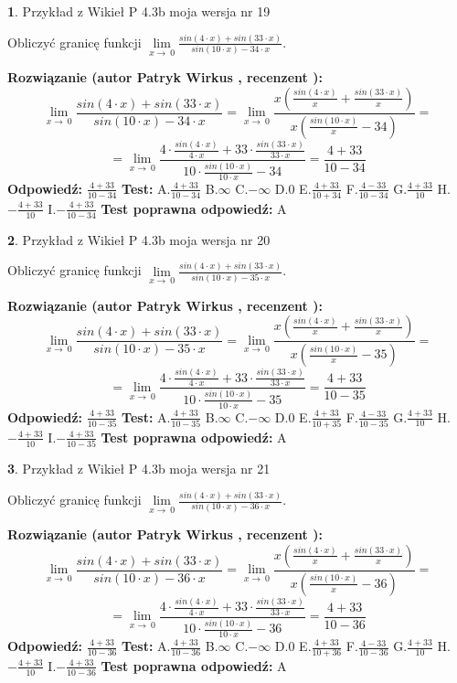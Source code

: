 \documentclass[12pt, a4paper]{article}
\theoremstyle{definition} %
\newtheorem{zad}{}
\newcommand{\zadStart}[1]{\begin{zad}#1\newline}
\newcommand{\zadStop}{\end{zad}}
\newcommand{\rozwStart}[2]{\noindent \textbf{Rozwiązanie (autor #1 , recenzent #2): }\newline}
\newcommand{\rozwStop}{\newline}
\newcommand{\odpStart}{\noindent \textbf{Odpowiedź:}\newline}
\newcommand{\odpStop}{\newline}
\newcommand{\testStart}{\noindent \textbf{Test:}\newline}
\newcommand{\testStop}{\newline}
\newcommand{\kluczStart}{\noindent \textbf{Test poprawna odpowiedź:}\newline}
\newcommand{\kluczStop}{\newline}
\begin{document}
\zadStart{Przykład z Wikieł P 4.3b moja wersja nr 19}


Obliczyć granicę funkcji $\lim\limits_{x\to\ 0}\frac{sin(4 \cdot x)+sin(33 \cdot x)}{sin(10 \cdot x)-34 \cdot x}$.
\zadStop
\rozwStart{Patryk Wirkus}{}
$$\lim\limits_{x\to\ 0}\frac{sin(4 \cdot x)+sin(33 \cdot x)}{sin(10 \cdot x)-34 \cdot x}=\lim\limits_{x\to\ 0}\frac{x(\frac{sin(4 \cdot x)}{x}+\frac{sin(33 \cdot x)}{x})}{x(\frac{sin(10 \cdot x)}{x}-34)}=$$
$$=\lim\limits_{x\to\ 0}\frac{4 \cdot \frac{sin(4 \cdot x)}{4 \cdot x}+33 \cdot \frac{sin(33 \cdot x)}{33 \cdot x}}{10 \cdot \frac{sin(10 \cdot x)}{10 \cdot x}-34}=\frac{4+33}{10-34}$$
\rozwStop
\odpStart
$\frac{4+33}{10-34}$
\odpStop
\testStart
A.$\frac{4+33}{10-34}$
B.$\infty$
C.$-\infty$
D.$0$
E.$\frac{4+33}{10+34}$
F.$\frac{4-33}{10-34}$
G.$\frac{4+33}{10}$
H.$-\frac{4+33}{10}$
I.$-\frac{4+33}{10-34}$
\testStop
\kluczStart
A
\kluczStop



\zadStart{Przykład z Wikieł P 4.3b moja wersja nr 20}


Obliczyć granicę funkcji $\lim\limits_{x\to\ 0}\frac{sin(4 \cdot x)+sin(33 \cdot x)}{sin(10 \cdot x)-35 \cdot x}$.
\zadStop
\rozwStart{Patryk Wirkus}{}
$$\lim\limits_{x\to\ 0}\frac{sin(4 \cdot x)+sin(33 \cdot x)}{sin(10 \cdot x)-35 \cdot x}=\lim\limits_{x\to\ 0}\frac{x(\frac{sin(4 \cdot x)}{x}+\frac{sin(33 \cdot x)}{x})}{x(\frac{sin(10 \cdot x)}{x}-35)}=$$
$$=\lim\limits_{x\to\ 0}\frac{4 \cdot \frac{sin(4 \cdot x)}{4 \cdot x}+33 \cdot \frac{sin(33 \cdot x)}{33 \cdot x}}{10 \cdot \frac{sin(10 \cdot x)}{10 \cdot x}-35}=\frac{4+33}{10-35}$$
\rozwStop
\odpStart
$\frac{4+33}{10-35}$
\odpStop
\testStart
A.$\frac{4+33}{10-35}$
B.$\infty$
C.$-\infty$
D.$0$
E.$\frac{4+33}{10+35}$
F.$\frac{4-33}{10-35}$
G.$\frac{4+33}{10}$
H.$-\frac{4+33}{10}$
I.$-\frac{4+33}{10-35}$
\testStop
\kluczStart
A
\kluczStop



\zadStart{Przykład z Wikieł P 4.3b moja wersja nr 21}


Obliczyć granicę funkcji $\lim\limits_{x\to\ 0}\frac{sin(4 \cdot x)+sin(33 \cdot x)}{sin(10 \cdot x)-36 \cdot x}$.
\zadStop
\rozwStart{Patryk Wirkus}{}
$$\lim\limits_{x\to\ 0}\frac{sin(4 \cdot x)+sin(33 \cdot x)}{sin(10 \cdot x)-36 \cdot x}=\lim\limits_{x\to\ 0}\frac{x(\frac{sin(4 \cdot x)}{x}+\frac{sin(33 \cdot x)}{x})}{x(\frac{sin(10 \cdot x)}{x}-36)}=$$
$$=\lim\limits_{x\to\ 0}\frac{4 \cdot \frac{sin(4 \cdot x)}{4 \cdot x}+33 \cdot \frac{sin(33 \cdot x)}{33 \cdot x}}{10 \cdot \frac{sin(10 \cdot x)}{10 \cdot x}-36}=\frac{4+33}{10-36}$$
\rozwStop
\odpStart
$\frac{4+33}{10-36}$
\odpStop
\testStart
A.$\frac{4+33}{10-36}$
B.$\infty$
C.$-\infty$
D.$0$
E.$\frac{4+33}{10+36}$
F.$\frac{4-33}{10-36}$
G.$\frac{4+33}{10}$
H.$-\frac{4+33}{10}$
I.$-\frac{4+33}{10-36}$
\testStop
\kluczStart
A
\kluczStop
\end{document}

